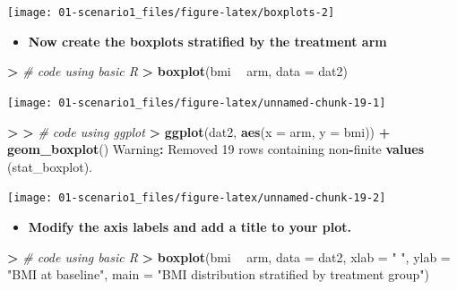 \documentclass[
]{book}
\newenvironment{Shaded}{\begin{snugshade}}{\end{snugshade}}
\newcommand{\CommentTok}[1]{\textcolor[rgb]{0.56,0.35,0.01}{\textit{#1}}}
\newcommand{\DataTypeTok}[1]{\textcolor[rgb]{0.13,0.29,0.53}{#1}}
\newcommand{\DecValTok}[1]{\textcolor[rgb]{0.00,0.00,0.81}{#1}}
\newcommand{\ErrorTok}[1]{\textcolor[rgb]{0.64,0.00,0.00}{\textbf{#1}}}
\newcommand{\KeywordTok}[1]{\textcolor[rgb]{0.13,0.29,0.53}{\textbf{#1}}}
\newcommand{\NormalTok}[1]{#1}
\newcommand{\OperatorTok}[1]{\textcolor[rgb]{0.81,0.36,0.00}{\textbf{#1}}}
\newcommand{\StringTok}[1]{\textcolor[rgb]{0.31,0.60,0.02}{#1}}
\providecommand{\tightlist}{%
  \setlength{\itemsep}{0pt}\setlength{\parskip}{0pt}}
\begin{document}
\begin{center}\texttt{[image: 01-scenario1\_files/figure-latex/boxplots-2]} \end{center}

\begin{itemize}
\tightlist
\item
  \textbf{Now create the boxplots stratified by the treatment arm}
\end{itemize}

\begin{Shaded}
\begin{Highlighting}[]
\OperatorTok{>}\StringTok{ }\CommentTok{# code using basic R}
\ErrorTok{>}\StringTok{ }\KeywordTok{boxplot}\NormalTok{(bmi }\OperatorTok{~}\StringTok{ }\NormalTok{arm, }\DataTypeTok{data =}\NormalTok{ dat2)}
\end{Highlighting}
\end{Shaded}

\begin{center}\texttt{[image: 01-scenario1\_files/figure-latex/unnamed-chunk-19-1]} \end{center}

\begin{Shaded}
\begin{Highlighting}[]
\OperatorTok{>}\StringTok{ }
\ErrorTok{>}\StringTok{ }\CommentTok{# code using ggplot}
\ErrorTok{>}\StringTok{ }\KeywordTok{ggplot}\NormalTok{(dat2, }\KeywordTok{aes}\NormalTok{(}\DataTypeTok{x =}\NormalTok{ arm, }\DataTypeTok{y =}\NormalTok{ bmi)) }\OperatorTok{+}\StringTok{ }\KeywordTok{geom_boxplot}\NormalTok{()}
\NormalTok{Warning}\OperatorTok{:}\StringTok{ }\NormalTok{Removed }\DecValTok{19}\NormalTok{ rows containing non}\OperatorTok{-}\NormalTok{finite }\KeywordTok{values}\NormalTok{ (stat_boxplot).}
\end{Highlighting}
\end{Shaded}

\begin{center}\texttt{[image: 01-scenario1\_files/figure-latex/unnamed-chunk-19-2]} \end{center}

\begin{itemize}
\tightlist
\item
  \textbf{Modify the axis labels and add a title to your plot.}
\end{itemize}

\begin{Shaded}
\begin{Highlighting}[]
\OperatorTok{>}\StringTok{ }\CommentTok{# code using basic R}
\ErrorTok{>}\StringTok{ }\KeywordTok{boxplot}\NormalTok{(bmi }\OperatorTok{~}\StringTok{ }\NormalTok{arm, }\DataTypeTok{data =}\NormalTok{ dat2, }\DataTypeTok{xlab =} \StringTok{" "}\NormalTok{, }\DataTypeTok{ylab =} \StringTok{"BMI at baseline"}\NormalTok{, }\DataTypeTok{main =} \StringTok{"BMI distribution stratified by treatment group"}\NormalTok{)}
\end{Highlighting}
\end{Shaded}
\end{document}
